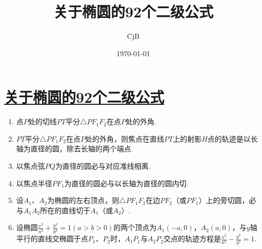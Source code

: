 \documentclass{article}
\title{关于椭圆的92个二级公式}
\author{CjB}
\date{\chinesedate\today}
\begin{document}
\maketitle %

\tableofcontents %
\newpage

\section{\href{https://www.bilibili.com/video/BV12h41147FS/?spm_id_from=333.999.top_right_bar_window_history.content.click&vd_source=9b93cf0c44112a0e78e9ab65807c27c8}{关于椭圆的92个二级公式}}

\begin{enumerate}[label=\arabic*.] %


\item 点$P$处的切线$PT$平分$\triangle PF_1F_2$在点$P$处的外角.

\item $PT$平分$\triangle PF_1F_2$在点$P$处的外角，则焦点在直线$PT$上的射影$H$点的轨迹是以长轴为直径的圆，除去长轴的两个端点.

\item 以焦点弦$PQ$为直径的圆必与对应准线相离.

\item 以焦点半径$PF_1$为直径的圆必与以长轴为直径的圆内切.

\item 设$A_1$、$A_2$为椭圆的左右顶点，则$\triangle PF_1F_2$在边$PF_2$（或$PF_1$）上的旁切圆，必与$A_1A_2$所在的直线切于$A_1$（或$A_2$）.

\item 设椭圆$\frac{x^2}{a^2} + \frac{y^2}{b^2} = 1 \left(a > b > 0\right)$的两个顶点为$A_1\left(-a,0\right)$，$A_2\left(a,0\right)$，与$y$轴平行的直线交椭圆于点$P_1$、$P_2$时，$A_1P_1$与$A_2P_2$交点的轨迹方程是$\frac{x^2}{a^2} - \frac{y^2}{b^2} = 1 $. 


\end{enumerate}
\end{document}

